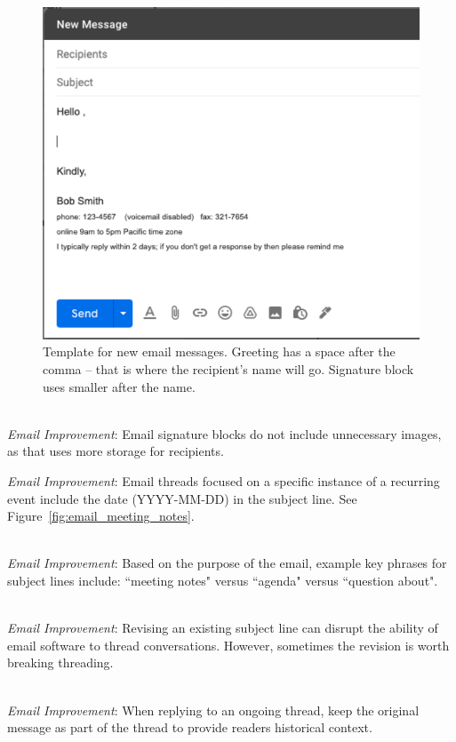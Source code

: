 \begin{figure}
\includegraphics[width=1\textwidth]{images/email_template.pdf}
\caption{Template for new email messages. Greeting has a space after the comma -- that is where the recipient's name will go. Signature block uses smaller after the name.}
\label{fig:email_template}
\end{figure}

\ \\
\textit{Email Improvement}: Email signature blocks do not include unnecessary images, as that uses more storage for recipients.


\textit{Email Improvement}: Email threads focused on a specific instance of a recurring event include the date (YYYY-MM-DD) in the subject line. See Figure~\ref{fig:email_meeting_notes}.

\ \\
\textit{Email Improvement}: Based on the purpose of the email, example key phrases for subject lines include: ``meeting notes" versus ``agenda" versus ``question about".

\ \\
\textit{Email Improvement}: Revising an existing subject line can disrupt the ability of email software to thread conversations. However, sometimes the revision is worth breaking threading.

\ \\
\textit{Email Improvement}: When replying to an ongoing thread, keep the original message as part of the thread to provide readers historical context.

